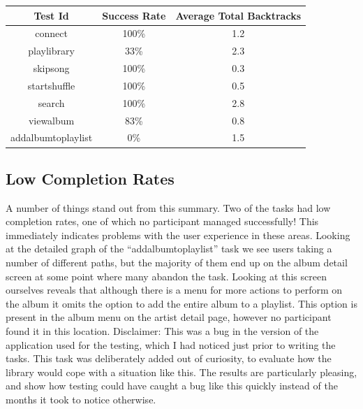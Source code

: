 \begin{tabular}{| c | c | c |}
\hline
Test Id & Success Rate & Average Total Backtracks \\
\hline
connect & 100\% & 1.2 \\
playlibrary & 33\% & 2.3\\
skipsong & 100\% & 0.3 \\
startshuffle & 100\% & 0.5 \\
search & 100\% & 2.8 \\
viewalbum & 83\% & 0.8 \\
addalbumtoplaylist & 0\% & 1.5 \\
\hline
\end{tabular}

\subsection{Low Completion Rates}

A number of things stand out from this summary. Two of the tasks had low completion
rates, one of which no participant managed successfully! This immediately indicates problems with
the user experience in these areas. Looking at the detailed graph of the ``addalbumtoplaylist''
task we see users taking a
number of different paths, but the majority of them end up on the album detail screen at some
point where many abandon the task. Looking at this screen ourselves reveals that although
there is a menu for more actions to perform on the album it omits the option to add
the entire album to a playlist. This option is present in the album menu on the artist
detail page, however no participant found it in this location. Disclaimer: This was
a bug in the version of the application used for the testing, which I had noticed just
prior to writing the tasks. This task was deliberately added out of curiosity, to evaluate
how the library would cope with a situation like this. The results are particularly pleasing,
and show how testing could have caught a bug like this quickly instead of the months it took
to notice otherwise.

